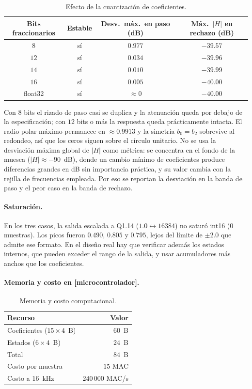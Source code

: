 \begin{table}[h]
\centering
\begin{tabular}{|c|c|c|c|}
\hline
\textbf{Bits fraccionarios} & \textbf{Estable} & \textbf{Desv.\ máx.\ en paso (dB)} & \textbf{Máx.\ $|H|$ en rechazo (dB)} \\ \hline
$8$ & sí & $0.977$ & $-39.57$ \\ \hline
$12$ & sí & $0.034$ & $-39.96$ \\ \hline
$14$ & sí & $0.010$ & $-39.99$ \\ \hline
$16$ & sí & $0.005$ & $-40.00$ \\ \hline
float32 & sí & $\approx 0$ & $-40.00$ \\ \hline
\end{tabular}
\caption{Efecto de la cuantización de coeficientes.}
\label{tab:cuant}
\end{table}

Con $8$ bits el rizado de paso casi se duplica y la atenuación queda por debajo de la especificación; con $12$ bits o más la respuesta queda prácticamente intacta. El radio polar máximo permanece en $\approx 0.9913$ y la simetría $b_0 = b_2$ sobrevive al redondeo, así que los ceros siguen sobre el círculo unitario. No se usa la desviación máxima global de $|H|$ como métrica: se concentra en el fondo de la muesca ($|H|\approx -90$~dB), donde un cambio mínimo de coeficientes produce diferencias grandes en dB sin importancia práctica, y su valor cambia con la rejilla de frecuencias empleada. Por eso se reportan la desviación en la banda de paso y el peor caso en la banda de rechazo.

\paragraph{Saturación.} En los tres casos, la salida escalada a Q1.14 ($1.0 \leftrightarrow 16384$) no saturó int16 ($0$ muestras). Los picos fueron $0.490$, $0.805$ y $0.795$, lejos del límite de $\pm 2.0$ que admite ese formato. En el diseño real hay que verificar además los estados internos, que pueden exceder el rango de la salida, y usar acumuladores más anchos que los coeficientes.

\paragraph{Memoria y costo en [microcontrolador].}

\begin{table}[h]
\centering
\begin{tabular}{|l|r|}
\hline
\textbf{Recurso} & \textbf{Valor} \\ \hline
Coeficientes ($15 \times 4$~B) & $60$~B \\ \hline
Estados ($6 \times 4$~B) & $24$~B \\ \hline
Total & $84$~B \\ \hline
Costo por muestra & $15$ MAC \\ \hline
Costo a $16$~kHz & $240\,000$ MAC/s \\ \hline
\end{tabular}
\caption{Memoria y costo computacional.}
\label{tab:mem}
\end{table}

